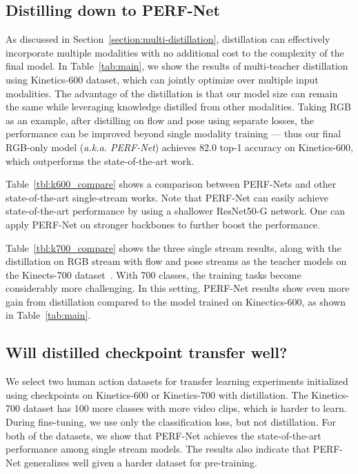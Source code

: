 \documentclass[10pt,twocolumn,letterpaper]{article}
\begin{document}
\subsection{Distilling down to PERF-Net}
As discussed in Section~\ref{section:multi-distillation}, distillation can effectively incorporate multiple modalities with no additional cost to the complexity of the final model.
In Table~\ref{tab:main}, we show the results of multi-teacher distillation using Kinetics-600 dataset, which can jointly optimize over multiple input modalities. 
The advantage of the distillation is that our model
size can remain the same while leveraging knowledge distilled
from other
modalities. Taking RGB as an example, after distilling on flow
and pose using separate losses, the performance can be improved beyond single
modality training --- thus our final RGB-only model (\emph{a.k.a. PERF-Net})
achieves 82.0 top-1 accuracy on Kinetics-600, which outperforms the state-of-the-art work.

Table~\ref{tbl:k600_compare} shows a comparison between PERF-Nets and other state-of-the-art single-stream works. Note that PERF-Net can easily achieve state-of-the-art performance by using a shallower ResNet50-G network. One can apply PERF-Net on stronger backbones to further boost the performance.

Table~\ref{tbl:k700_compare} shows the three single stream results, along with the distillation on RGB stream with flow and pose streams as the teacher models on the Kinects-700 dataset~\cite{carreira2019short}. With 700 classes, the training tasks become considerably more challenging. In this setting, PERF-Net results show even more gain from distillation compared to the model trained on Kinectics-600, as shown in Table~\ref{tab:main}.












\subsection{Will distilled checkpoint transfer well?}
We select two human action datasets for transfer learning experiments initialized using checkpoints on Kinetics-600 or Kinetics-700 with distillation. 
The Kinetics-700 dataset has 100 more classes with more video clips, which is harder to learn. 
During fine-tuning, we use only the classification loss, but not distillation.
For both of the datasets, we show that PERF-Net achieves the state-of-the-art performance among single stream models. 
The results also indicate that PERF-Net generalizes well given a harder dataset for pre-training. 
\end{document}
